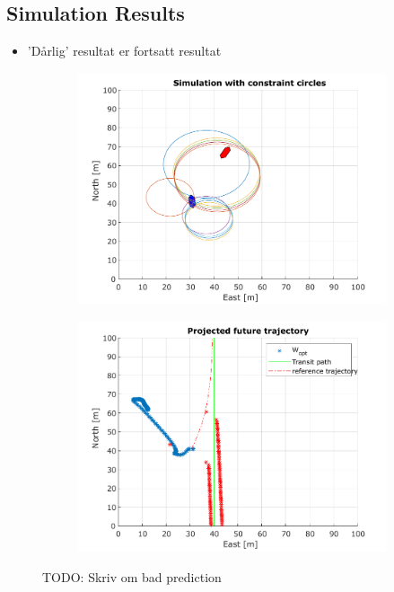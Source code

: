 \subsection{Simulation Results}
\begin{itemize}
    \item 'Dårlig' resultat er fortsatt resultat
\end{itemize}

\begin{figure} %
    \centering
    \begin{subfigure}[b]{0.45\textwidth}
        \centering
        \includegraphics[width=\textwidth]{Images/BadPrediction_Caught_in_constraints.pdf}
    \end{subfigure}
    \hfill 
    \begin{subfigure}[b]{0.45\textwidth}
        \centering
        \includegraphics[width=\textwidth]{images/BadPrediction_w_opt.pdf}
    \end{subfigure}
    \caption{TODO: Skriv om bad prediction}
\end{figure}


